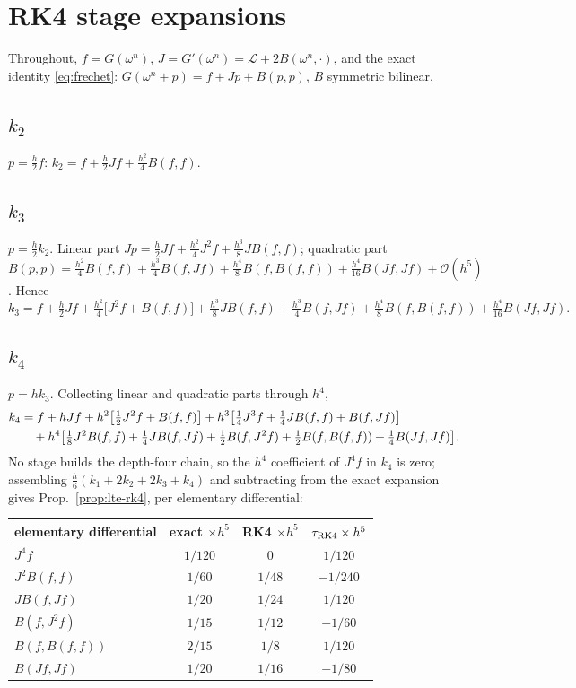 \documentclass[11pt]{article}
\theoremstyle{plain}
\theoremstyle{definition}
\newcommand{\Lop}{\mathcal{L}}
\newcommand{\bO}{\mathcal{O}}
\begin{document}
\appendix
\section{RK4 stage expansions}
\label{app:stages}
Throughout, $f=G(\omega^n)$, $J=G'(\omega^n)=\Lop+2B(\omega^n,\cdot)$, and the
exact identity \eqref{eq:frechet}: $G(\omega^n+p)=f+Jp+B(p,p)$, $B$ symmetric
bilinear.

\subsection{$k_2$}
$p=\tfrac h2f$:
$k_2=f+\tfrac h2Jf+\tfrac{h^2}4B(f,f)$.

\subsection{$k_3$}
$p=\tfrac h2k_2$. Linear part
$Jp=\tfrac h2Jf+\tfrac{h^2}4J^2f+\tfrac{h^3}8JB(f,f)$; quadratic part
$B(p,p)=\tfrac{h^2}4B(f,f)+\tfrac{h^3}4B(f,Jf)
+\tfrac{h^4}8B(f,B(f,f))+\tfrac{h^4}{16}B(Jf,Jf)+\bO(h^5)$. Hence
\begin{equation}
k_3=f+\tfrac h2Jf+\tfrac{h^2}4\big[J^2f+B(f,f)\big]
+\tfrac{h^3}8JB(f,f)+\tfrac{h^3}4B(f,Jf)
+\tfrac{h^4}8B(f,B(f,f))+\tfrac{h^4}{16}B(Jf,Jf).
\end{equation}

\subsection{$k_4$}
$p=hk_3$. Collecting linear and quadratic parts through $h^4$,
\begin{align}
k_4&=f+hJf+h^2\big[\tfrac12J^2f+B(f,f)\big]
+h^3\big[\tfrac14J^3f+\tfrac14JB(f,f)+B(f,Jf)\big]\notag\\
&\quad+h^4\big[\tfrac18J^2B(f,f)+\tfrac14JB(f,Jf)+\tfrac12B(f,J^2f)
+\tfrac12B(f,B(f,f))+\tfrac14B(Jf,Jf)\big].
\end{align}
No stage builds the depth-four chain, so the $h^4$ coefficient of $J^4f$ in
$k_4$ is zero; assembling $\tfrac h6(k_1+2k_2+2k_3+k_4)$ and subtracting from
the exact expansion gives Prop.~\ref{prop:lte-rk4}, per elementary
differential:
\begin{center}\small
\renewcommand{\arraystretch}{1.3}
\begin{tabular}{lccc}
\toprule
elementary differential & exact $\times h^5$ & RK4 $\times h^5$ &
$\tau_{\rm RK4}\times h^5$\\
\midrule
$J^4f$        & $1/120$ & $0$    & $1/120$\\
$J^2B(f,f)$   & $1/60$  & $1/48$ & $-1/240$\\
$JB(f,Jf)$    & $1/20$  & $1/24$ & $1/120$\\
$B(f,J^2f)$   & $1/15$  & $1/12$ & $-1/60$\\
$B(f,B(f,f))$ & $2/15$  & $1/8$  & $1/120$\\
$B(Jf,Jf)$    & $1/20$  & $1/16$ & $-1/80$\\
\bottomrule
\end{tabular}
\end{center}
\end{document}
